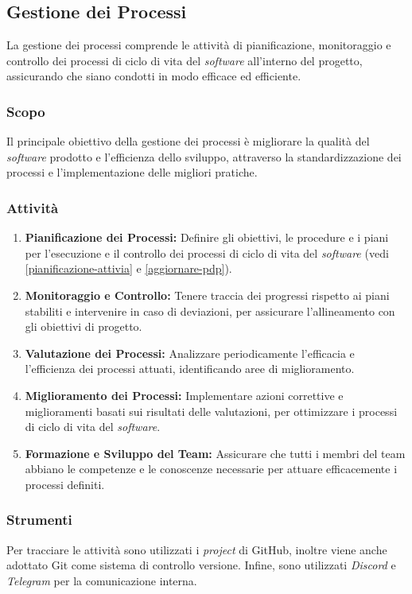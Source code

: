 \subsection{Gestione dei Processi}

La gestione dei processi comprende le attività di pianificazione, monitoraggio
e controllo dei processi di ciclo di vita del \textit{software} all'interno del
progetto, assicurando che siano condotti in modo efficace ed efficiente.

\subsubsection{Scopo}
Il principale obiettivo della gestione dei processi è migliorare la qualità
del \textit{software} prodotto e l'efficienza dello sviluppo, attraverso la
standardizzazione dei processi e l'implementazione delle migliori pratiche.

\subsubsection{Attività}
\begin{enumerate}
	\item \textbf{Pianificazione dei Processi:} Definire gli obiettivi, le
	      procedure e i piani per l'esecuzione e il controllo dei processi di
	      ciclo di vita del \textit{software} (vedi
	      \autoref{pianificazione-attivia} e \autoref{aggiornare-pdp}).
	\item \textbf{Monitoraggio e Controllo:} Tenere traccia dei progressi
	      rispetto ai piani stabiliti e intervenire in caso di deviazioni, per
	      assicurare l'allineamento con gli obiettivi di progetto.
	\item \textbf{Valutazione dei Processi:} Analizzare periodicamente
	      l'efficacia e l'efficienza dei processi attuati, identificando aree di
	      miglioramento.
	\item \textbf{Miglioramento dei Processi:} Implementare azioni correttive e
	      miglioramenti basati sui risultati delle valutazioni, per ottimizzare
	      i processi di ciclo di vita del \textit{software}.
	\item \textbf{Formazione e Sviluppo del Team:} Assicurare che tutti i membri
	      del team abbiano le competenze e le conoscenze necessarie per attuare
	      efficacemente i processi definiti.
\end{enumerate}

\subsubsection{Strumenti}
Per tracciare le attività sono utilizzati i \textit{project} di GitHub, inoltre
viene anche adottato Git come sistema di controllo versione. Infine, sono
utilizzati \textit{Discord} e \textit{Telegram} per la comunicazione interna.

